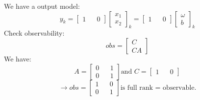 \documentclass[12pt,a4paper]{article}
\begin{document}
	We have a output model:
	\begin{equation}
		\boxed{
			y_k = 
			\begin{bmatrix}
				1 &   & 0 
			\end{bmatrix}
			\begin{bmatrix}
				x_1 \\
				x_2 
			\end{bmatrix}_k = 
			\begin{bmatrix}
				1 &   & 0 
			\end{bmatrix}
			\begin{bmatrix}
				\omega \\
				b      
			\end{bmatrix}_k
		}
		\label{eq15}
	\end{equation}
	Check observability:
	\[obs = 
	\begin{bmatrix}
		C  \\
		CA 
	\end{bmatrix}\]
	We have:
	\[A = 
	\begin{bmatrix}
		0 &   & 1 \\
		0 &   & 1 
	\end{bmatrix} \text{and } C = 
	\begin{bmatrix}
		1 &   & 0 
	\end{bmatrix}\]
	\[\rightarrow obs = 
	\begin{bmatrix}
		1 &   & 0 \\
		0 &   & 1 
	\end{bmatrix} \text{is full rank = observable.}\]
	
	
	
	
	
	
	
	
\end{document}

